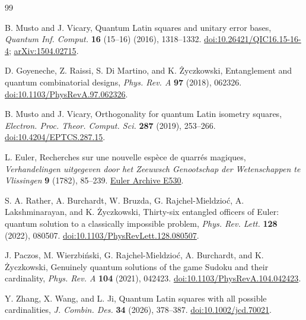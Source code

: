 \documentclass[11pt]{article}
\theoremstyle{definition}
\begin{document}
\begin{thebibliography}{99}
\small
\setlength{\itemsep}{0pt}

B. Musto and J. Vicary,
\newblock Quantum Latin squares and unitary error bases,
\newblock \emph{Quantum Inf. Comput.} \textbf{16} (15--16) (2016),
1318--1332.
\newblock \href{https://doi.org/10.26421/QIC16.15-16-4}
{doi:10.26421/QIC16.15-16-4};
\href{https://arxiv.org/abs/1504.02715}{arXiv:1504.02715}.

D. Goyeneche, Z. Raissi, S. Di Martino, and K. \.{Z}yczkowski,
\newblock Entanglement and quantum combinatorial designs,
\newblock \emph{Phys. Rev. A} \textbf{97} (2018), 062326.
\newblock \href{https://doi.org/10.1103/PhysRevA.97.062326}
{doi:10.1103/PhysRevA.97.062326}.

B. Musto and J. Vicary,
\newblock Orthogonality for quantum Latin isometry squares,
\newblock \emph{Electron. Proc. Theor. Comput. Sci.} \textbf{287} (2019),
253--266.
\newblock \href{https://doi.org/10.4204/EPTCS.287.15}
{doi:10.4204/EPTCS.287.15}.

L. Euler,
\newblock Recherches sur une nouvelle esp\`ece de quarr\'es magiques,
\newblock \emph{Verhandelingen uitgegeven door het Zeeuwsch Genootschap der
Wetenschappen te Vlissingen} \textbf{9} (1782), 85--239.
\newblock \href{https://scholarlycommons.pacific.edu/euler-works/530/}
{Euler Archive E530}.

S. A. Rather, A. Burchardt, W. Bruzda, G. Rajchel-Mieldzio\'c,
A. Lakshminarayan, and K. \.{Z}yczkowski,
\newblock Thirty-six entangled officers of Euler: quantum solution to a
classically impossible problem,
\newblock \emph{Phys. Rev. Lett.} \textbf{128} (2022), 080507.
\newblock \href{https://doi.org/10.1103/PhysRevLett.128.080507}
{doi:10.1103/PhysRevLett.128.080507}.

J. Paczos, M. Wierzbi\'nski, G. Rajchel-Mieldzio\'c, A. Burchardt, and
K. \.{Z}yczkowski,
\newblock Genuinely quantum solutions of the game Sudoku and their
cardinality,
\newblock \emph{Phys. Rev. A} \textbf{104} (2021), 042423.
\newblock
\href{https://doi.org/10.1103/PhysRevA.104.042423}
{doi:10.1103/PhysRevA.104.042423}.

Y. Zhang, X. Wang, and L. Ji,
\newblock Quantum Latin squares with all possible cardinalities,
\newblock \emph{J. Combin. Des.} \textbf{34} (2026), 378--387.
\newblock \href{https://doi.org/10.1002/jcd.70021}
{doi:10.1002/jcd.70021}.


\end{thebibliography}
\end{document}
